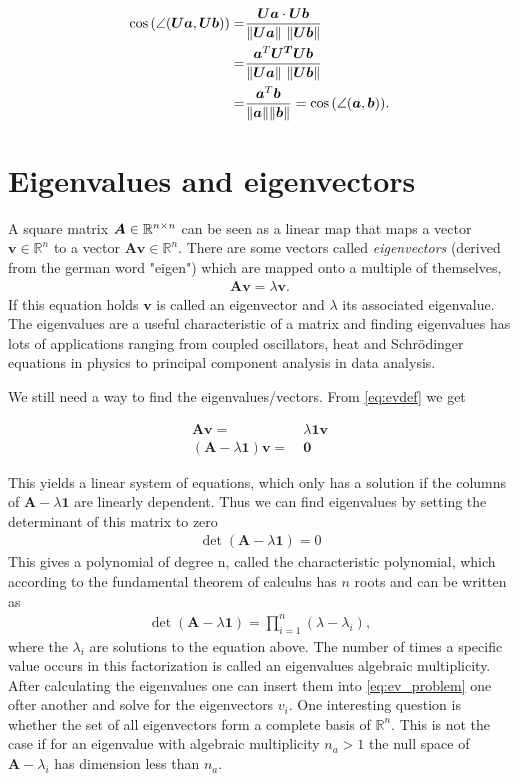 \begin{align}
    \cos{(\angle(\bm{Ua}, \bm{Ub}))} =&   \frac{\bm{U}\bm{a} \cdot \bm{U} \bm{b}}{\norm{\bm{Ua}} \ \norm{\bm{Ub}} }\\
    =& \frac{\bm{a}^T \bm{U^T} \bm{U} \bm{b}}{\norm{\bm{Ua}} \ \norm{\bm{Ub}} }\\
     =& \frac{\bm{a}^T \bm{b}}{\norm{\bm{a}} \norm{\bm{b}}} = \cos{(\angle(\bm{a}, \bm{b}))}.
\end{align}
\newcommand{\R}{\mathbb{R}}
\section{Eigenvalues and eigenvectors}
A square matrix $\bm{A} \in \R^{n \x n}$ can be seen as a linear map that maps a vector $\bm{v} \in \R^n$ to a vector $\bm{Av} \in \R^n$.
There are some vectors called \emph{eigenvectors} (derived from the german word "eigen") which are mapped onto a multiple of themselves,
\begin{align}
    \bm{Av} = \lambda \bm{v}.
    \label{eq:evdef}
\end{align}
If this equation holds $\bm{v}$ is called an eigenvector and $\lambda$ its associated eigenvalue.
The eigenvalues are a useful characteristic of a matrix and finding eigenvalues has lots of applications ranging from coupled oscillators, heat and Schrödinger equations in
physics to principal component analysis in data analysis.

We still need a way to find the eigenvalues/vectors. 
From \eqref{eq:evdef} we get 

\begin{align}
    \bm{Av} =& \ \lambda \bm{1}\bm{v} \\
    (\bm{A} - \lambda \bm{1})\bm{v} =& \ \bm{0}
    \label{eq:ev_problem}
\end{align}

This yields a linear system of equations, which only has a solution if the columns of 
$ \bm{A}-\lambda \bm{1}$ are linearly dependent.
Thus we can find eigenvalues by setting the determinant of this matrix to zero
\begin{align}
    \det(\bm{A} - \lambda \bm{1}) = 0    
\end{align}
This gives a polynomial of degree n, called the characteristic polynomial, which according to the fundamental
theorem of calculus has $n$ roots and can be written as
\begin{align}
    \det(\bm{A} - \lambda \bm{1}) = \prod_{i=1}^n (\lambda - \lambda_i),
\end{align}
where the $\lambda_i$ are solutions to the equation above. 
The number of times a specific value occurs in this factorization is called 
an eigenvalues algebraic multiplicity.
After calculating the eigenvalues one can insert them into \eqref{eq:ev_problem} one ofter another and solve for the eigenvectors
$v_i$. One interesting question is whether the set of all eigenvectors form a complete basis of $\R^n$. 
This is not the case if for an eigenvalue with algebraic multiplicity $n_a > 1$ the null space of $\bm{A} - \lambda_i$ has dimension less than $n_a$.


